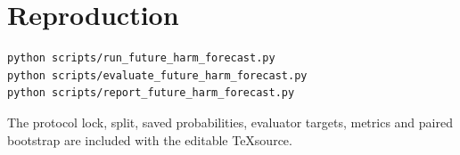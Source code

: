 \documentclass[10pt,a4paper]{article}
\begin{document}
\section{Reproduction}
\begin{verbatim}
python scripts/run_future_harm_forecast.py
python scripts/evaluate_future_harm_forecast.py
python scripts/report_future_harm_forecast.py
\end{verbatim}
The protocol lock, split, saved probabilities, evaluator targets, metrics and paired bootstrap are included with the editable \TeX source.
\end{document}
